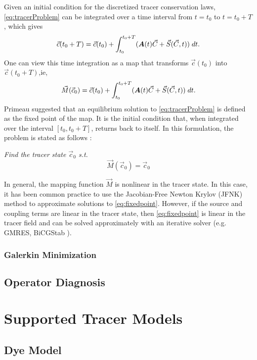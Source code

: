 \documentclass{softwaremanual}
\begin{document}
 Given an initial condition for the discretized tracer conservation laws, \eqref{eq:tracerProblem} can be integrated over a time interval from $t=t_0$ to $t=t_0+T$, which gives
 \begin{equation}
 \vec{c}(t_0 + T) = \vec{c}(t_0) + \int_{t_0}^{t_0+T} ( \boldsymbol{A}(t) \vec{C} + \vec{S}(\vec{C},t) ) \hspace{1mm} dt. \label{eq:integrated}
 \end{equation}
 One can view this time integration as a map that transforms $\vec{c}(t_0)$ into $\vec{c}(t_0+T)$,ie,
 \begin{equation}
 \vec{M}(\vec{c}_0) = \vec{c}(t_0) + \int_{t_0}^{t_0+T} ( \boldsymbol{A}(t) \vec{C} + \vec{S}(\vec{C},t) ) \hspace{1mm} dt.
 \end{equation}
Primeau suggested that an equilibrium solution to \eqref{eq:tracerProblem} is defined as the fixed point of the map. It is the initial condition that, when integrated over the interval $[t_0,t_0+T]$, returns back to itself. In this formulation, the problem is stated as follows :
\begin{center}
\textit{ Find the tracer state $\vec{c}_0$ s.t. }
\begin{equation}
\vec{M}(\vec{c}_0) = \vec{c}_0 \label{eq:fixedpoint}
\end{equation}
\end{center}
In general, the mapping function $\vec{M}$ is nonlinear in the tracer state. In this case, it has been common practice to use the Jacobian-Free Newton Krylov (JFNK) method to approximate solutions to \eqref{eq:fixedpoint}. However, if the source and coupling terms are linear in the tracer state, then \eqref{eq:fixedpoint} is linear in the tracer field and can be solved approximately with an iterative solver (e.g. GMRES, BiCGStab ).
\subsection{Galerkin Minimization}

\section{Operator Diagnosis}


\chapter{Supported Tracer Models}

\section{Dye Model}
\end{document}
